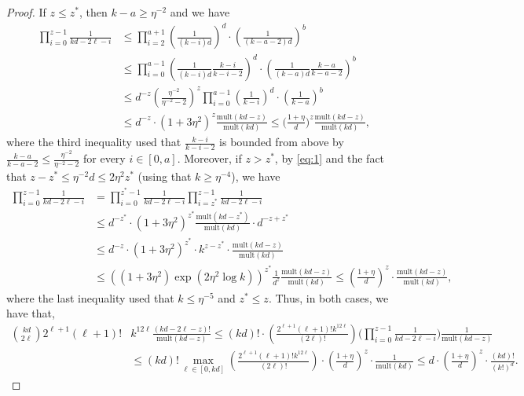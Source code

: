 \documentclass[reqno,final,a4paper]{amsart}
\theoremstyle{definition}
\newcommand{\mult}{\mathrm{mult}}
\newcommand{\1}{\mathbbm{1}}
\begin{document}
\begin{proof}
\vspace{3mm}
\noindent 
If $z\leq z^*$, then $k-a\geq \eta^{-2}$ and we have
\begin{align}\label{eq:1}
  \prod_{i=0}^{z-1} \frac{1}{kd -2\ell-i}& \leq
\prod_{i=2}^{a+1} \left( \frac{1}{(k-i)d}  \right)^{d}
\cdot \left( \frac{1}{(k-a-2)d} \right)^{b} \nonumber
\\& \leq \prod_{i=0}^{a-1} \left( \frac{1}{(k-i)d} \frac{k-i}{k-i-2}  \right)^{d}
\cdot \left( \frac{1}{(k-a)d}\frac{k-a}{k-a-2} \right)^{b} \nonumber
\\&\leq d^{-z} \left(\frac{\eta^{-2}}{\eta^{-2}-2}\right)^z \prod_{i=0}^{a-1} \left(\frac{1}{k-i}\right)^d
\cdot \left( \frac{1}{k-a} \right)^{b} \nonumber
\\& \leq d^{-z} \cdot \left(1+3\eta^2\right)^z \frac{\mult(kd-z)}{\mult(kd)} \leq \bigg(\frac{1+\eta}{d}\bigg)^z \frac{\mult(kd-z)}{\mult(kd)},
\end{align}
where the third inequality used that $\tfrac{k-i}{k-i-2}$ is bounded from above by $\frac{k-a}{k-a-2}\le \frac{\eta^{-2}}{\eta^{-2}-2}$ for every $i\in [0,a]$.
Moreover, if $z > z^*$, by \eqref{eq:1} and the fact that $z-z^*\le\eta^{-2}d\leq 2\eta^2z^* $ (using that $k\ge \eta^{-4}$), we have
\begin{align}\label{eq:2}
  \prod_{i=0}^{z-1} \frac{1}{kd -2\ell-i}& =\prod_{i=0}^{z^*-1} \frac{1}{kd -2\ell-i} \prod_{i=z^*}^{z-1} \frac{1}{kd -2\ell-i}
  \nonumber
  \\&   \leq  d^{-z^*} \cdot \left(1+3\eta^2\right)^{z^*} \frac{\mult(kd-z^*)}{\mult(kd)} \cdot d^{-z+z^*} \nonumber 
  \\& \leq  d^{-z} \cdot \left(1+3\eta^2\right)^{z^*} \cdot k^{z-z^*} \cdot \frac{\mult(kd-z)}{\mult(kd)} \nonumber 
\\& \leq  ((1+3\eta^2)\exp(2\eta^{2}\log k))^{z^*}  \frac{1}{d^z}\frac{\mult(kd-z)}{\mult(kd)}\leq \left(\frac{1+\eta}{d} \right)^z \cdot \frac{\mult(kd-z)}{\mult(kd)},
\nonumber
\end{align}
where the last inequality used that $k\leq \eta^{-5}$ and $z^*\le z$.
Thus, in both cases, we have that, 
\begin{align*}
\binom{kd}{2\ell} 2^{\ell+1} (\ell+1)! 
&k^{12\ell} \frac{(kd-2\ell-z)!}{\mult(kd-z)}\leq (kd)! \cdot\left(\frac{2^{\ell+1} (\ell+1)! k^{12\ell}}{(2\ell)!}\right) \bigg(\prod_{i=0}^{z-1}\frac{1}{kd-2\ell-i}\bigg) \frac{1}{\mult(kd-z)}\\
&\leq (kd)! \max_{\ell\in [0,kd]} \left(\frac{2^{\ell+1} (\ell+1)! k^{12\ell}}{(2\ell)!}\right) \cdot \left(\frac{1+\eta}{d} \right)^z \cdot \frac{1}{\mult(kd)} \leq  d \cdot \left(\frac{1+\eta}{d} \right)^z \cdot \frac{(kd)!}{(k!)^d}. 
\end{align*}


\end{proof}
\end{document}
